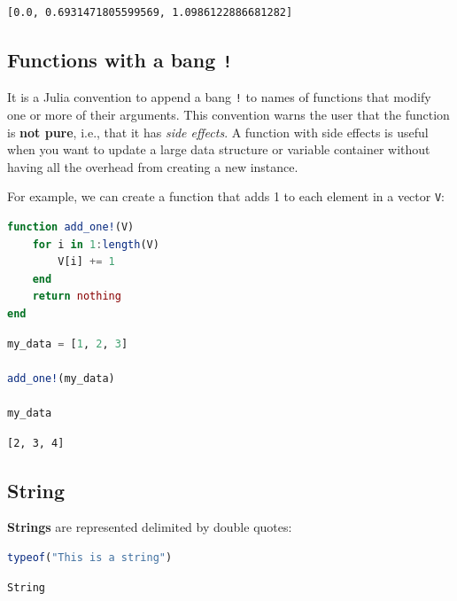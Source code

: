 \documentclass[
  notoc %
]{tufte-book}
\newcommand{\passthrough}[1]{#1}
\begin{document}
\begin{lstlisting}[language=Output]
[0.0, 0.6931471805599569, 1.0986122886681282]
\end{lstlisting}

\hypertarget{sec:function_bang}{%
\subsection{\texorpdfstring{Functions with a bang
\texttt{!}}{Functions with a bang !}}\label{sec:function_bang}}

It is a Julia convention to append a bang \passthrough{\lstinline"!"} to
names of functions that modify one or more of their arguments. This
convention warns the user that the function is \textbf{not pure}, i.e.,
that it has \emph{side effects}. A function with side effects is useful
when you want to update a large data structure or variable container
without having all the overhead from creating a new instance.

For example, we can create a function that adds 1 to each element in a
vector \passthrough{\lstinline!V!}:

\begin{lstlisting}[language=Julia]
function add_one!(V)
    for i in 1:length(V)
        V[i] += 1
    end
    return nothing
end
\end{lstlisting}

\begin{lstlisting}[language=Julia]
my_data = [1, 2, 3]

add_one!(my_data)

my_data
\end{lstlisting}

\begin{lstlisting}[language=Output]
[2, 3, 4]
\end{lstlisting}

\hypertarget{sec:string}{%
\subsection{String}\label{sec:string}}

\textbf{Strings} are represented delimited by double quotes:

\begin{lstlisting}[language=Julia]
typeof("This is a string")
\end{lstlisting}

\begin{lstlisting}[language=Output]
String
\end{lstlisting}
\end{document}

